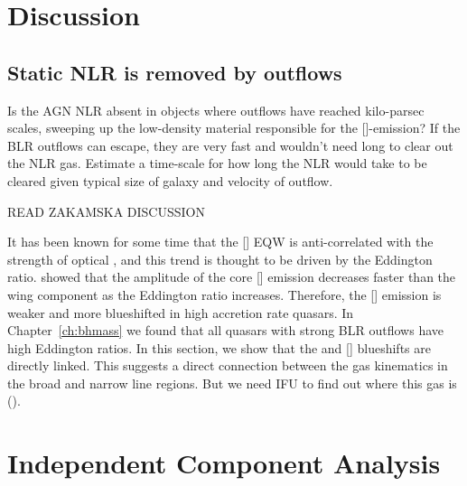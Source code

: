 \section{Discussion}

\subsection{Static NLR is removed by outflows}

Is the AGN NLR absent in objects where outflows have reached kilo-parsec scales, sweeping up the low-density material responsible for the []-emission?
If the BLR outflows can escape, they are very fast and wouldn't need long to clear out the NLR gas. 
Estimate a time-scale for how long the NLR would take to be cleared given typical size of galaxy and velocity of outflow. 

READ ZAKAMSKA DISCUSSION

It has been known for some time that the [] EQW is anti-correlated with the strength of optical , and this trend is thought to be driven by the Eddington ratio. 
\citet{shen14} showed that the amplitude of the core [] emission decreases faster than the wing component as the Eddington ratio increases. 
Therefore, the [] emission is weaker and more blueshifted in high accretion rate quasars.  
In Chapter~\ref{ch:bhmass} we found that all quasars with strong BLR outflows have high Eddington ratios. 
In this section, we show that the  and [] blueshifts are directly linked. 
This suggests a direct connection between the gas kinematics in the broad and narrow line regions. 
But we need IFU to find out where this gas is (). 


\section{Independent Component Analysis}


